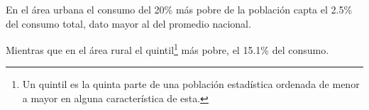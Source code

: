 En el área urbana el consumo del 20\% más pobre de la población    capta  el 2.5\% del consumo total, dato mayor al del promedio nacional.

Mientras que en el área rural el quintil\footnote{Un quintil es la quinta parte de una población estadística ordenada de menor a mayor en alguna característica de esta.} más pobre,  el 15.1\% del consumo.